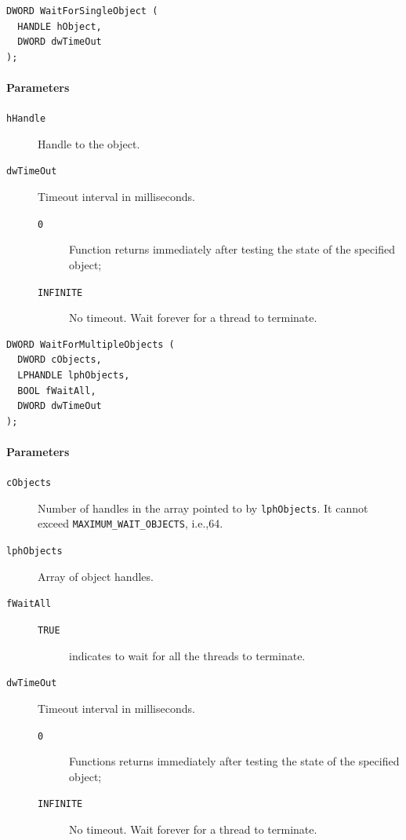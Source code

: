 \begin{verbatim}
DWORD WaitForSingleObject (
  HANDLE hObject,
  DWORD dwTimeOut
);
\end{verbatim}

\paragraph{Parameters}
\begin{description}
\item [\texttt{hHandle}] Handle to the object.
\item [\texttt{dwTimeOut}] Timeout interval in milliseconds.
\begin{description}
\item [\texttt{0}] Function returns immediately after testing the state of the specified object;
\item [\texttt{INFINITE}] No timeout. Wait forever for a thread to terminate.
\end{description}
\end{description}

\begin{verbatim}
DWORD WaitForMultipleObjects (
  DWORD cObjects,
  LPHANDLE lphObjects,
  BOOL fWaitAll,
  DWORD dwTimeOut
);
\end{verbatim}

\paragraph{Parameters}
\begin{description}
\item [\texttt{cObjects}] Number of handles in the array pointed to by \texttt{lphObjects}. It cannot exceed \texttt{MAXIMUM\_WAIT\_OBJECTS}, i.e.,\@ 64.
\item [\texttt{lphObjects}] Array of object handles.
\item [\texttt{fWaitAll}]
\begin{description}
\item [\texttt{TRUE}] indicates to wait for all the threads to terminate.
\end{description}
\item [\texttt{dwTimeOut}] Timeout interval in milliseconds.
\begin{description}
\item [\texttt{0}] Functions returns immediately after testing the state of the specified object;
\item [\texttt{INFINITE}] No timeout. Wait forever for a thread to terminate.
\end{description}
\end{description}

